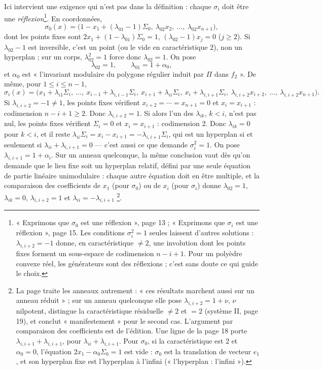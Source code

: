 \documentclass[11pt,a4paper]{article}
\begin{document}
Ici intervient une exigence qui n'est pas dans la définition : chaque
$\sigma_i$ doit être une \emph{réflexion}\footnote{« Exprimons que $\sigma_0$ est
une réflexion », page 13 ; « Exprimons que $\sigma_i$ est une réflexion »,
page 15. Les conditions $\sigma_i^2 = 1$ seules laissent d'autres solutions :
$\lambda_{i,i+2} = -1$ donne, en caractéristique $\neq 2$, une involution dont
les points fixes forment un sous-espace de codimension $n - i + 1$. Pour un
polyèdre convexe réel, les générateurs sont des réflexions ; c'est sans doute
ce qui guide le choix.}. En coordonnées,
\[
\sigma_0(x) = \bigl(1 - x_1 + (\lambda_{01} - 1)\Sigma_0,\ \lambda_{02} x_2,\
\dots,\ \lambda_{02} x_{n+1}\bigr),
\]
dont les points fixes sont $2x_1 + (1 - \lambda_{01})\Sigma_0 = 1$,
$(\lambda_{02} - 1)x_j = 0$ ($j \geq 2$). Si $\lambda_{02} - 1$ est inversible,
c'est un point (ou le vide en caractéristique $2$), non un hyperplan ; sur un
corps, $\lambda_{02}^2 = 1$ force donc $\lambda_{02} = 1$. On pose
\[
\lambda_{02} = 1, \qquad \lambda_{01} = 1 + \alpha_0 ,
\]
et $\alpha_0$ est « l'invariant modulaire du polygone régulier induit par $\Pi$
dans $f_2$ ». De même, pour $1 \leq i \leq n-1$,
\[
\sigma_i(x) = \bigl(x_1 + \lambda_{i1}\Sigma_i,\ \dots,\ x_{i-1} +
\lambda_{i,i-1}\Sigma_i,\ x_{i+1} + \lambda_{ii}\Sigma_i,\ x_i +
\lambda_{i,i+1}\Sigma_i,\ \lambda_{i,i+2} x_{i+2},\ \dots,\ \lambda_{i,i+2}
x_{n+1}\bigr) .
\]
Si $\lambda_{i,i+2} = -1 \neq 1$, les points fixes vérifient $x_{i+2} = \cdots =
x_{n+1} = 0$ et $x_i = x_{i+1}$ : codimension $n - i + 1 \geq 2$. Donc
$\lambda_{i,i+2} = 1$. Si alors l'un des $\lambda_{ik}$, $k < i$, n'est pas nul,
les points fixes vérifient $\Sigma_i = 0$ et $x_i = x_{i+1}$ : codimension $2$.
Donc $\lambda_{ik} = 0$ pour $k < i$, et il reste $\lambda_{ii}\Sigma_i = x_i -
x_{i+1} = -\lambda_{i,i+1}\Sigma_i$, qui est un hyperplan si et seulement si
$\lambda_{ii} + \lambda_{i,i+1} = 0$ --- c'est aussi ce que demande $\sigma_i^2
= 1$. On pose $\lambda_{i,i+1} = 1 + \alpha_i$. Sur un anneau quelconque, la
même conclusion vaut dès qu'on demande que le lieu fixe soit un hyperplan
relatif, défini par une seule équation de partie linéaire unimodulaire : chaque
autre équation doit en être multiple, et la comparaison des coefficients de
$x_1$ (pour $\sigma_0$) ou de $x_i$ (pour $\sigma_i$) donne $\lambda_{02} = 1$,
$\lambda_{ik} = 0$, $\lambda_{i,i+2} = 1$ et $\lambda_{ii} = -\lambda_{i,i+1}$
\footnote{La page traite les anneaux autrement : « ces résultats marchent
aussi sur un anneau réduit » ; sur un anneau quelconque elle pose
$\lambda_{i,i+2} = 1 + \nu$, $\nu$ nilpotent, distingue la caractéristique
résiduelle $\neq 2$ et $= 2$ (système II, page 19), et conclut « manifestement »
pour le second cas. L'argument par comparaison des coefficients est de
l'édition. Une ligne de la page 18 porte $\lambda_{i,i+1} + \lambda_{i,i+1}$,
pour $\lambda_{ii} + \lambda_{i,i+1}$. Pour $\sigma_0$, si la caractéristique
est $2$ et $\alpha_0 = 0$, l'équation $2x_1 - \alpha_0\Sigma_0 = 1$ est vide :
$\sigma_0$ est la translation de vecteur $e_1$, et son hyperplan fixe est
l'hyperplan à l'infini (« l'hyperplan : l'infini »).}.
\end{document}
